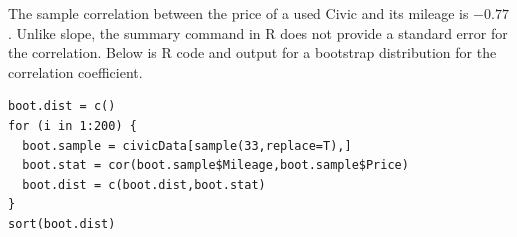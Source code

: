 \documentclass[11pt]{exam}
\begin{document}
\begin{questions}


\newpage
\question The sample correlation between the price of a used Civic and its mileage is $-0.77$.  Unlike slope, the summary command in R does not provide a standard error for the correlation.  Below is R code and output for a bootstrap distribution for the correlation coefficient.  

{\small
\begin{verbatim}
boot.dist = c()
for (i in 1:200) {
  boot.sample = civicData[sample(33,replace=T),]
  boot.stat = cor(boot.sample$Mileage,boot.sample$Price)
  boot.dist = c(boot.dist,boot.stat)
}
sort(boot.dist)


\end{verbatim}}
\end{questions}
\end{document}

